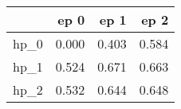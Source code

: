 \begin{tabular}{lrrr}
\toprule
{} &   ep 0 &   ep 1 &   ep 2 \\
\midrule
hp\_0 &  0.000 &  0.403 &  0.584 \\
hp\_1 &  0.524 &  0.671 &  0.663 \\
hp\_2 &  0.532 &  0.644 &  0.648 \\
\bottomrule
\end{tabular}

